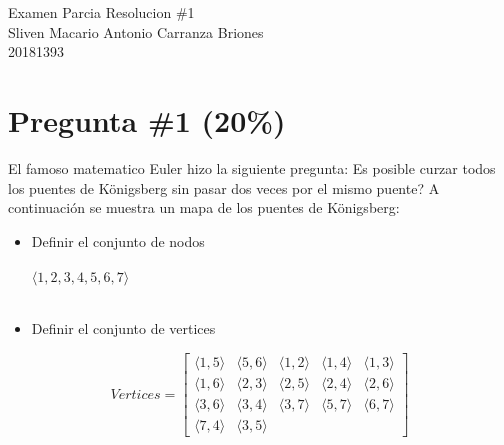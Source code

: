 \documentclass[10pt,a4paper]{article}
\author{Sliven Carranza}
\begin{document}
\begin{center}
        \huge{Examen Parcia Resolucion \#1} \\
        \large{Sliven Macario Antonio Carranza Briones} \\
        \large{20181393} \\
\end{center}
\section{Pregunta \#1 (20\%)}
El famoso matematico Euler hizo la siguiente pregunta: Es posible curzar todos los puentes
de K\"onigsberg sin pasar dos veces por el mismo puente? A continuaci\'on se muestra un
mapa de los puentes de K\"onigsberg:
\begin{itemize}
        \item{Definir el conjunto de nodos} \\\\
        $\langle 1 , 2 , 3 , 4 , 5 , 6 ,7 \rangle$  \\\\
        \item{Definir el conjunto de vertices}      
\end{itemize}
\[
 Vertices= \begin {bmatrix}
\langle 1, 5 \rangle & \langle 5, 6 \rangle & \langle 1, 2 \rangle & \langle 1, 4 \rangle  & \langle 1, 3 \rangle \\ 
\langle 1, 6 \rangle & \langle 2, 3 \rangle & \langle 2, 5 \rangle & \langle 2, 4 \rangle  & \langle 2, 6 \rangle \\
\langle 3, 6 \rangle & \langle 3, 4 \rangle & \langle 3, 7 \rangle & \langle 5, 7 \rangle  & \langle 6, 7 \rangle \\
\langle 7, 4 \rangle & \langle  3, 5 \rangle 
\end {bmatrix}
\] \\
\end{document}
